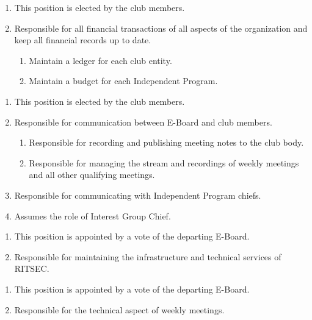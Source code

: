 
\begin{enumerate}
  \item This position is elected by the club members.
  \item Responsible for all financial transactions of all aspects of the
    organization and keep all financial records up to date.
  \begin{enumerate}
    \item Maintain a ledger for each club entity.
    \item Maintain a budget for each Independent Program.
  \end{enumerate}
\end{enumerate}


\begin{enumerate}
  \item This position is elected by the club members.
  \item Responsible for communication between E-Board and club members.
  \begin{enumerate}
    \item Responsible for recording and publishing meeting notes to the club
      body.
    \item Responsible for managing the stream and recordings of weekly meetings
      and all other qualifying meetings.
  \end{enumerate}
  \item Responsible for communicating with Independent Program chiefs.
  \item Assumes the role of Interest Group Chief.
\end{enumerate}


\begin{enumerate}
  \item This position is appointed by a vote of the departing E-Board.
  \item Responsible for maintaining the infrastructure and technical services
    of RITSEC.
\end{enumerate}


\begin{enumerate}
  \item This position is appointed by a vote of the departing E-Board.
  \item Responsible for the technical aspect of weekly meetings.
\end{enumerate}
